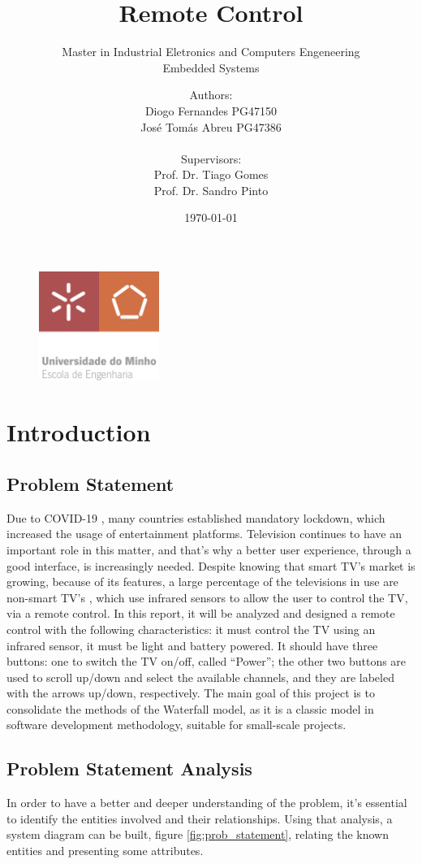 \documentclass[12pt, letterpaper]{report}
\title{\textbf{Remote Control}}
\subtitle{{\large Master in Industrial Eletronics and Computers Engeneering} \\ {\large Embedded Systems}}
\author{Authors:\\Diogo Fernandes PG47150\\José Tomás Abreu PG47386\\ \\ Supervisors:\\Prof. Dr. Tiago Gomes\\Prof. Dr. Sandro Pinto}
\date{\today}
\begin{document}
{\begin{figure}[t]
	\centering
	\includegraphics[width=0.35\textwidth]{EEUMLOGO}
	\end{figure}}

\maketitle

\tableofcontents
\clearpage
\chapter{Introduction}
\section{Problem Statement}
Due to COVID-19 \cite{covid}, many countries established mandatory lockdown, which increased the usage of entertainment platforms. Television continues to have an important role in this matter, and that’s why a better user experience, through a good interface, is increasingly needed.
Despite knowing that smart TV’s market is growing, because of its features, a large percentage of the televisions in use are non-smart TV’s \cite{smarttv}, which use infrared sensors to allow the user to control the TV, via a remote control. In this report, it will be analyzed and designed a remote control with the following characteristics: it must control the TV using an infrared sensor, it must be light and battery powered. It should have three buttons: one to switch the TV on/off, called “Power”; the other two buttons are used to scroll up/down and select the available channels, and they are labeled with the arrows up/down, respectively. The main goal of this project is to consolidate the methods of the Waterfall model, as it is a classic model in software development methodology, suitable for small-scale projects.

\section{Problem Statement Analysis}
In order to have a better and deeper understanding of the problem, it’s essential to identify the entities involved and their relationships. Using that analysis, a system diagram can be built, figure \ref{fig:prob_statement}, relating the known entities and presenting some attributes.
\end{document}
